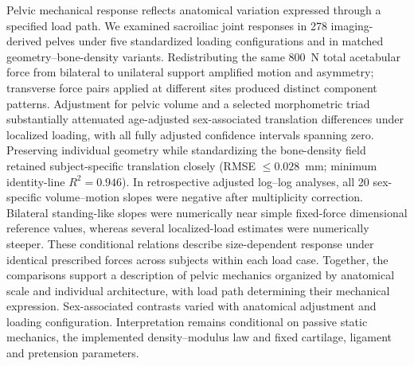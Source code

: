 Pelvic mechanical response reflects anatomical variation expressed through a specified load path. We examined sacroiliac joint responses in 278 imaging-derived pelves under five standardized loading configurations and in matched geometry--bone-density variants. Redistributing the same 800~N total acetabular force from bilateral to unilateral support amplified motion and asymmetry; transverse force pairs applied at different sites produced distinct component patterns. Adjustment for pelvic volume and a selected morphometric triad substantially attenuated age-adjusted sex-associated translation differences under localized loading, with all fully adjusted confidence intervals spanning zero. Preserving individual geometry while standardizing the bone-density field retained subject-specific translation closely (RMSE $\leq0.028$~mm; minimum identity-line $R^2=0.946$). In retrospective adjusted log--log analyses, all 20 sex-specific volume--motion slopes were negative after multiplicity correction. Bilateral standing-like slopes were numerically near simple fixed-force dimensional reference values, whereas several localized-load estimates were numerically steeper. These conditional relations describe size-dependent response under identical prescribed forces across subjects within each load case. Together, the comparisons support a description of pelvic mechanics organized by anatomical scale and individual architecture, with load path determining their mechanical expression. Sex-associated contrasts varied with anatomical adjustment and loading configuration. Interpretation remains conditional on passive static mechanics, the implemented density--modulus law and fixed cartilage, ligament and pretension parameters.
